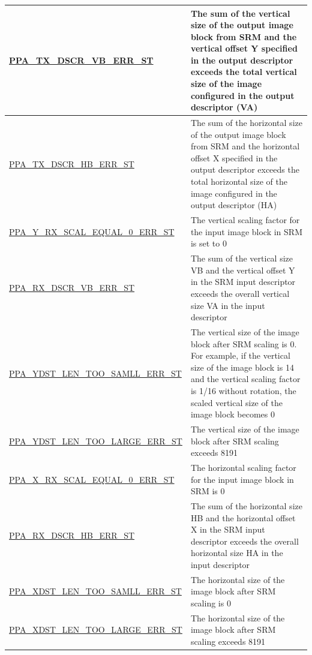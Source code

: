 \documentclass[main\_\_EN.tex]{subfiles}
\begin{document}
\begin{longtable}[c]{ |p{6cm}|p{10cm}| }
        \hyperref[fielddesc:PPATXDSCRVBERRST]{PPA\_TX\_DSCR\_VB\_ERR\_ST} & The sum of the vertical size of the output image block from SRM and the vertical offset Y specified in the output descriptor exceeds the total vertical size of the image configured in the output descriptor (VA) \\\hline
        \hyperref[fielddesc:PPATXDSCRHBERRST]{PPA\_TX\_DSCR\_HB\_ERR\_ST} & The sum of the horizontal size of the output image block from SRM and the horizontal offset X specified in the output descriptor exceeds the total horizontal size of the image configured in the output descriptor (HA) \\\hline
        \hyperref[fielddesc:PPAYRXSCALEQUAL0ERRST]{PPA\_Y\_RX\_SCAL\_EQUAL\_0\_ERR\_ST} & The vertical scaling factor for the input image block in SRM is set to 0 \\\hline
        \hyperref[fielddesc:PPARXDSCRVBERRST]{PPA\_RX\_DSCR\_VB\_ERR\_ST} & The sum of the vertical size VB and the vertical offset Y in the SRM input descriptor exceeds the overall vertical size VA in the input descriptor \\\hline
        \hyperref[fielddesc:PPAYDSTLENTOOSAMLLERRST]{PPA\_YDST\_LEN\_TOO\_SAMLL\_ERR\_ST} & The vertical size of the image block after SRM scaling is 0. For example, if the vertical size of the image block is 14 and the vertical scaling factor is 1/16 without rotation, the scaled vertical size of the image block becomes 0 \\\hline
        \hyperref[fielddesc:PPAYDSTLENTOOLARGEERRST]{PPA\_YDST\_LEN\_TOO\_LARGE\_ERR\_ST} & The vertical size of the image block after SRM scaling exceeds 8191 \\\hline
        \hyperref[fielddesc:PPAXRXSCALEQUAL0ERRST]{PPA\_X\_RX\_SCAL\_EQUAL\_0\_ERR\_ST} & The horizontal scaling factor for the input image block in SRM is 0 \\\hline
        \hyperref[fielddesc:PPARXDSCRHBERRST]{PPA\_RX\_DSCR\_HB\_ERR\_ST} & The sum of the horizontal size HB and the horizontal offset X in the SRM input descriptor exceeds the overall horizontal size HA in the input descriptor \\\hline
        \hyperref[fielddesc:PPAXDSTLENTOOSAMLLERRST]{PPA\_XDST\_LEN\_TOO\_SAMLL\_ERR\_ST} & The horizontal size of the image block after SRM scaling is 0 \\\hline
        \hyperref[fielddesc:PPAXDSTLENTOOLARGEERRST]{PPA\_XDST\_LEN\_TOO\_LARGE\_ERR\_ST} & The horizontal size of the image block after SRM scaling exceeds 8191 \\\hline

\end{longtable}
\end{document}
